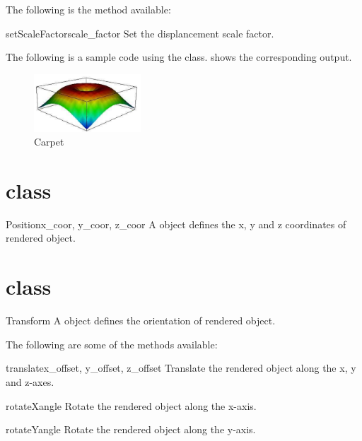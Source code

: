 The following is the method available:
\begin{methoddesc}[Carpet]{setScaleFactor}{scale_factor}
Set the displancement scale factor.
\end{methoddesc}

The following is a sample code using the \Carpet class.
 shows the corresponding output.


\begin{figure}[ht]
\begin{center}
\includegraphics[width=40mm]{figures/Carpet}
\end{center}
\caption{Carpet}
\label{fig:carpet.1}
\end{figure}


\section{\Position class}
\begin{classdesc}{Position}{x_coor, y_coor, z_coor}
A \Position object defines the x, y and z coordinates of rendered object.
\end{classdesc}

\section{\Transform class}
\begin{classdesc}{Transform}{}
A \Transform object defines the orientation of rendered object.
\end{classdesc}

The following are some of the methods available:
\begin{methoddesc}[Transform]{translate}{x_offset, y_offset, z_offset}
Translate the rendered object along the x, y and z-axes.
\end{methoddesc}

\begin{methoddesc}[Transform]{rotateX}{angle}
Rotate the rendered object along the x-axis.
\end{methoddesc}

\begin{methoddesc}[Transform]{rotateY}{angle}
Rotate the rendered object along the y-axis.
\end{methoddesc}

